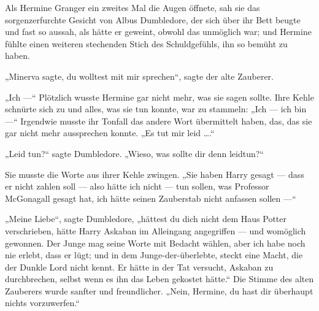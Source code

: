 Als Hermine Granger ein zweites Mal die Augen öffnete, sah sie das sorgenzerfurchte Gesicht von Albus Dumbledore, der sich über ihr Bett beugte und fast so aussah, als hätte er geweint, obwohl das unmöglich war; und Hermine fühlte einen weiteren stechenden Stich des Schuldgefühls, ihn so bemüht zu haben.

„Minerva sagte, du wolltest mit mir sprechen“, sagte der alte Zauberer.


„Ich —“ Plötzlich wusste Hermine gar nicht mehr, was sie sagen sollte. Ihre Kehle schnürte sich zu und alles, was sie tun konnte, war zu stammeln:
„Ich — ich bin —“ Irgendwie musste ihr Tonfall das andere Wort übermittelt haben, das, das sie gar nicht mehr aussprechen konnte.
„Es tut mir leid ….“

„Leid tun?“ sagte Dumbledore.
„Wieso, was sollte dir denn leidtun?“

Sie musste die Worte aus ihrer Kehle zwingen.
„Sie haben Harry gesagt — dass er nicht zahlen soll — also hätte ich nicht — tun sollen, was Professor McGonagall gesagt hat, ich hätte seinen Zauberstab nicht anfassen sollen —“

„Meine Liebe“, sagte Dumbledore, „hättest du dich nicht dem Haus Potter verschrieben, hätte Harry Askaban im Alleingang angegriffen — und womöglich gewonnen. Der Junge mag seine Worte mit Bedacht wählen, aber ich habe noch nie erlebt, dass er lügt; und in dem Junge-der-überlebte, steckt eine Macht, die der Dunkle Lord nicht kennt. Er hätte in der Tat versucht, Askaban zu durchbrechen, selbst wenn es ihn das Leben gekostet hätte.“ Die Stimme des alten Zauberers wurde sanfter und freundlicher.
„Nein, Hermine, du hast dir überhaupt nichts vorzuwerfen.“

